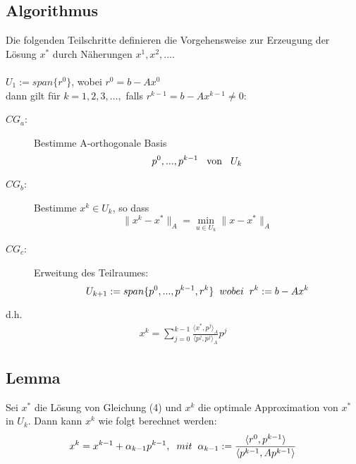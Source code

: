 \documentclass{article}
\begin{document}
\subsection{Algorithmus}
Die folgenden Teilschritte definieren die Vorgehensweise zur Erzeugung der Lösung $x^{*}$ durch Näherungen $x^{1}, x^{2},...$.
\\\\$U_{1} := span\{r^{0}\}$, wobei $r^{0} = b - Ax^{0}$
\\dann gilt für $k = 1,2,3,...,$ falls $r^{k-1} = b - Ax^{k-1} \ne 0$:
\begin{description}
\item[$CG_{a}$:] Bestimme A-orthogonale Basis
\begin{equation}
p^{0},...,p^{k-1} \hspace{3mm} \textnormal{von} \hspace{3mm} U_{k}
\end{equation}
\item[$CG_{b}$:] Bestimme $x^{k} \in U_{k}$, so dass
\begin{equation}
\|x^{k} - x^{*}\|_{A} = \underset{u \in U_{k}}{\min} \|x - x^{*}\|_{A}
\end{equation}
\item[$CG_{c}$:] Erweitung des Teilraumes:
\begin{equation}
U_{k+1} := span\{p^{0},...,p^{k-1},r^{k}\} \hspace{2mm} wobei \hspace{2mm} r^{k} := b - Ax^{k}
\end{equation}
\end{description}
d.h.
\begin{align}
x^{k} = \sum_{j=0}^{k-1} \frac {\langle x^{*}, p^{j} \rangle _{A}} {\langle p^{j}, p^{j} \rangle _{A}} p^{j}
\end{align}

\subsection{Lemma}
Sei $x^{*}$ die Lösung von Gleichung (4) und $x^{k}$ die optimale Approximation von $x^{*}$ in $U_{k}$. Dann kann $x^{k}$ wie folgt berechnet werden:
\begin{equation}
x^{k} = x^{k-1} + \alpha_{k-1}p^{k-1}, \hspace{2mm} mit \hspace{2mm} \alpha_{k-1} := \frac {\langle r^{0}, p^{k-1} \rangle} {\langle {p^{k-1}, Ap^{k-1}} \rangle}
\end{equation}
\end{document}
